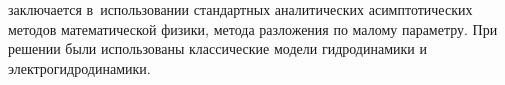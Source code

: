 {\methods} заключается в~использовании стандартных аналитических асимптотических методов математической физики, метода разложения по малому параметру. При решении были использованы классические модели гидродинамики и электрогидродинамики.

{}
\begin{enumerate}

\end{enumerate}
